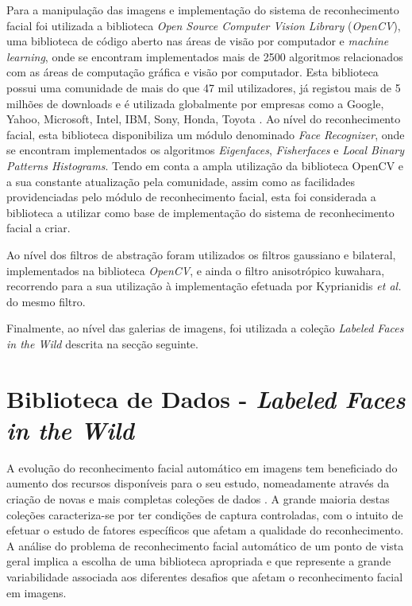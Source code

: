 Para a manipulação das imagens e implementação do sistema de reconhecimento facial foi utilizada a biblioteca \textit{Open Source Computer Vision Library} (\textit{OpenCV}), uma biblioteca de código aberto nas áreas de visão por computador e \textit{machine learning}, onde se encontram implementados mais de 2500 algoritmos relacionados com as áreas de computação gráfica e visão por computador. Esta biblioteca possui uma comunidade de mais do que 47 mil utilizadores, já registou mais de 5 milhões de downloads e é utilizada globalmente por empresas como a Google, Yahoo, Microsoft, Intel, IBM, Sony, Honda, Toyota \cite{Team}. Ao nível do reconhecimento facial, esta biblioteca disponibiliza um módulo denominado \textit{Face Recognizer}, onde se encontram implementados os algoritmos \textit{Eigenfaces}, \textit{Fisherfaces} e \textit{Local Binary Patterns Histograms}. Tendo em conta a ampla utilização da biblioteca OpenCV e a sua constante atualização pela comunidade, assim como as facilidades providenciadas pelo módulo de reconhecimento facial, esta foi considerada a biblioteca a utilizar como base de implementação do sistema de reconhecimento facial a criar.

Ao nível dos filtros de abstração foram utilizados os filtros gaussiano e bilateral, implementados na biblioteca \textit{OpenCV}, e ainda o filtro anisotrópico kuwahara, recorrendo para a sua utilização à implementação efetuada por Kyprianidis \textit{et al.} \cite{Kyprianidis2009} do mesmo filtro.

Finalmente, ao nível das galerias de imagens, foi utilizada a coleção \textit{Labeled Faces in the Wild} descrita na secção seguinte.


\section{Biblioteca de Dados - \textit{Labeled Faces in the Wild}} \label{sec:lfw}

A evolução do reconhecimento facial automático em imagens tem beneficiado do aumento dos recursos disponíveis para o seu estudo, nomeadamente através da criação de novas e mais completas coleções de dados \cite{Huang2007}. A grande maioria destas coleções caracteriza-se por ter condições de captura controladas, com o intuito de efetuar o estudo de fatores específicos que afetam a qualidade do reconhecimento. A análise do problema de reconhecimento facial automático de um ponto de vista geral implica a escolha de uma biblioteca apropriada e que represente a grande variabilidade associada aos diferentes desafios que afetam o reconhecimento facial em imagens.

